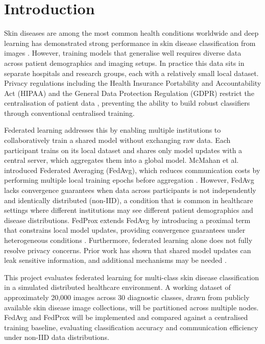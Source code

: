 \documentclass[12pt,openany,a4paper]{book}
\begin{document}
\chapter{Introduction}
  Skin diseases are among the most common health conditions worldwide \cite{hayGlobalBurdenSkin2014} and deep learning has demonstrated strong performance in skin disease classification from images \cite{estevaDermatologistlevelClassificationSkin2017}. However, training models that generalise well requires diverse data across patient demographics and imaging setups. In practice this data sits in separate hospitals and research groups, each with a relatively small local dataset. Privacy regulations including the Health Insurance Portability and Accountability Act (HIPAA) and the General Data Protection Regulation (GDPR) restrict the centralisation of patient data \cite{kaissisSecurePrivacypreservingFederated2020}, preventing the ability to build robust classifiers through conventional centralised training.

  Federated learning addresses this by enabling multiple institutions to collaboratively train a shared model without exchanging raw data. Each participant trains on its local dataset and shares only model updates with a central server, which aggregates them into a global model. McMahan et al. introduced Federated Averaging (FedAvg), which reduces communication costs by performing multiple local training epochs before aggregation \cite{mcmahanCommunicationEfficientLearningDeep2023}. However, FedAvg lacks convergence guarantees when data across participants is not independently and identically distributed (non-IID), a condition that is common in healthcare settings where different institutions may see different patient demographics and disease distributions. FedProx extends FedAvg by introducing a proximal term that constrains local model updates, providing convergence guarantees under heterogeneous conditions \cite{liFederatedOptimizationHeterogeneous2020}. Furthermore, federated learning alone does not fully resolve privacy concerns. Prior work has shown that shared model updates can leak sensitive information, and additional mechanisms may be needed \cite{kaissisSecurePrivacypreservingFederated2020}.

  This project evaluates federated learning for multi-class skin disease classification in a simulated distributed healthcare environment. A working dataset of approximately 20,000 images across 30 diagnostic classes, drawn from publicly available skin disease image collections, will be partitioned across multiple nodes. FedAvg and FedProx will be implemented and compared against a centralised training baseline, evaluating classification accuracy and communication efficiency under non-IID data distributions.
\end{document}
